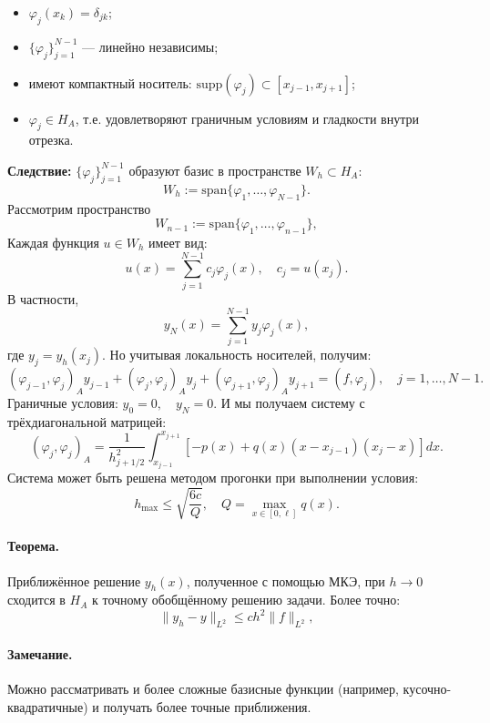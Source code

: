 \begin{itemize}
  \item \( \varphi_j(x_k) = \delta_{jk} \);
  \item \( \{ \varphi_j \}_{j=1}^{N-1} \) — линейно независимы;
  \item имеют компактный носитель: \( \mathrm{supp}(\varphi_j) \subset [x_{j-1}, x_{j+1}] \);
  \item \( \varphi_j \in H_A \), т.е. удовлетворяют граничным условиям и гладкости внутри отрезка.
\end{itemize}
\textbf{Следствие:} \( \{ \varphi_j \}_{j=1}^{N-1} \) образуют базис в пространстве \( W_h \subset H_A \):
\[
W_h := \mathrm{span}\{ \varphi_1, \dots, \varphi_{N-1} \}.
\]
Рассмотрим пространство
\[
W_{n-1} := \mathrm{span}\{\varphi_1, \dots, \varphi_{n-1}\},
\]
Каждая функция \( u \in W_h \) имеет вид:
\[
u(x) = \sum_{j=1}^{N-1} c_j \varphi_j(x), \quad c_j = u(x_j).
\]
В частности,
\[
y_N(x) = \sum_{j=1}^{N-1} y_j \varphi_j(x),
\]
где \( y_j = y_h(x_j) \).
Но учитывая локальность носителей, получим:
\[
(\varphi_{j-1}, \varphi_j)_A y_{j-1} + (\varphi_j, \varphi_j)_A y_j + (\varphi_{j+1}, \varphi_j)_A y_{j+1} = (f, \varphi_j), \quad j = 1, \dots, N-1.
\]
Граничные условия: \( y_0 = 0, \quad y_N = 0 \).
И мы получаем систему с трёхдиагональной матрицей:
\[
(\varphi_j, \varphi_j)_A = \frac{1}{h_{j+1/2}^2} \int_{x_{j-1}}^{x_{j+1}} \left[ -p(x) + q(x)(x - x_{j - 1})(x_j - x) \right] dx.
\]
Система может быть решена методом прогонки при выполнении условия:
\[
h_{\max} \le \sqrt{\frac{6 c}{Q}}, \quad Q = \max_{x \in [0, \ell]} q(x).
\]

\paragraph{Теорема.} Приближённое решение \( y_h(x) \), полученное с помощью МКЭ, при \( h \to 0 \) сходится в \( H_A \) к точному обобщённому решению задачи. Более точно:
\[
\| y_h - y \|_{L^2} \le c h^2 \|f\|_{L^2},
\]

\paragraph{Замечание.} Можно рассматривать и более сложные базисные функции (например, кусочно-квадратичные) и получать более точные приближения.